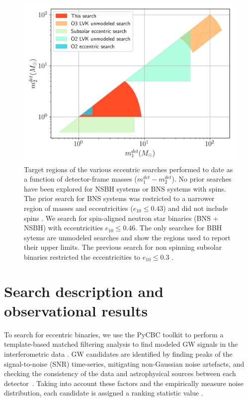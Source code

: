 \begin{figure}
    \centering
    \includegraphics[width=\textwidth]{figures/ecc_search/Search_region.png}
    \caption{ Target regions of the various eccentric searches performed to date \cite{Nitz:2019spj,Nitz:2021vqh,LIGOScientific:2019dag,LIGOScientific:2023lpe} as a function of detector-frame masses ($m_1^{det}-m_2^{det}$). No prior searches have been explored for NSBH systems or BNS systems with spins. The prior search for BNS systems was restricted to a narrower region of masses and eccentricities ($e_{10} \leq 0.43$) and did not include spins \cite{Nitz:2019spj}. We search for spin-aligned neutron star binaries (BNS + NSBH) with eccentricities $e_{10} \leq 0.46$. The only searches for BBH sytems are unmodeled searches \cite{LIGOScientific:2019dag,LIGOScientific:2023lpe} and show the regions used to report their upper limits. The previous search for non spinning subsolar binaries restricted the eccentricities to $e_{10} \leq 0.3$ \cite{Nitz:2021vqh}.}
    \label{fig:search_region}
\end{figure}


\section{Search description and observational results}
To search for eccentric binaries, we use the PyCBC toolkit to perform a template-based matched filtering analysis to find modeled GW signals in the interferometric data \cite{Usman:2015kfa,Nitz:2017svb}. GW candidates are identified by finding peaks of the signal-to-noise (SNR) time-series, mitigating non-Gaussian noise artefacts, and checking the consistency of the data and astrophysical sources between each detector~\cite{Allen:2004gu, Nitz:2017lco,Davies:2020tsx}. Taking into account these factors and the empirically measure noise distribution, each candidate is assigned a ranking statistic value \cite{Nitz:2017svb, Davies:2020tsx, Was:2009vh}.


